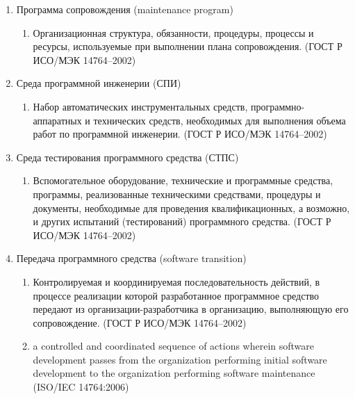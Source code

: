 \begin{enumerate}
    \item Программа сопровождения (maintenance program)
    \begin{enumerate}
        \item Организационная структура, обязанности, процедуры, процессы и ресурсы, используемые при выполнении плана сопровождения.
        (ГОСТ Р ИСО/МЭК 14764--2002)
    \end{enumerate}

    \item Среда программной инженерии (СПИ)
    \begin{enumerate}
        \item Набор автоматических инструментальных средств, программно-аппаратных и технических средств, необходимых для выполнения объема работ по программной инженерии.
        (ГОСТ Р ИСО/МЭК 14764--2002)
    \end{enumerate}

    \item Среда тестирования программного средства (СТПС)
    \begin{enumerate}
        \item Вспомогательное оборудование, технические и программные средства, программы, реализованные техническими средствами, процедуры и документы, необходимые для проведения квалификационных, а возможно, и других испытаний (тестирований) программного средства.
        (ГОСТ Р ИСО/МЭК 14764--2002)
    \end{enumerate}

    \item Передача программного средства (software transition)
    \begin{enumerate}
        \item Контролируемая и координируемая последовательность действий, в процессе реализации которой разработанное программное средство передают из организации-разработчика в организацию, выполняющую его сопровождение.
        (ГОСТ Р ИСО/МЭК 14764--2002)
        \item a controlled and coordinated sequence of actions wherein software development passes from the organization performing initial software development to the organization performing software maintenance
        (ISO/IEC 14764:2006)
    \end{enumerate}
\end{enumerate}